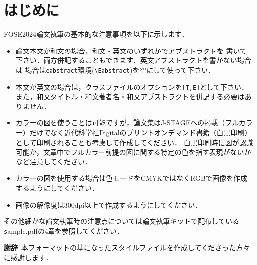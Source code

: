 \documentclass[T,J]{fose} %
\begin{document}
\section{はじめに}
FOSE2024\cite{fose2024}論文執筆の基本的な注意事項を以下に示します．
\begin{itemize}
\item 論文本文が和文の場合，和文・英文のいずれかでアブストラクトを
書いて下さい．両方併記することもできます．英文アブストラクトを書かない場合は
場合は{\tt eabstract}環境(\verb|\Eabstract|)を空にして使って下さい．
\item 本文が英文の場合は，クラスファイルのオプションを{\verb|[T,E]|}として下さい．
また，和文タイトル・和文著者名・和文アブストラクトを併記する必要はありません．
\item カラーの図を使うことは可能ですが，論文集はJ-STAGEへの掲載（フルカラー）だけでなく近代科学社Digitalのプリントオンデマンド書籍（白黒印刷）として印刷されることも考慮して作成してください．
白黒印刷時に図が認識可能か，文章中でフルカラー前提の図に関する特定の色を指す表現がないかなど注意してください．
\item カラーの図を使用する場合は色モードをCMYKではなくRGBで画像を作成するようにしてください．
\item 画像の解像度は300dpi以上で作成するようにしてください．
\end{itemize}
その他細かな論文執筆時の注意点については論文執筆キットで配布している{\texttt sample.pdf}の4章を参照してください．

\textbf{謝辞}\
本フォーマットの基になったスタイルファイルを作成してくださった方々に感謝します．





\end{document}
